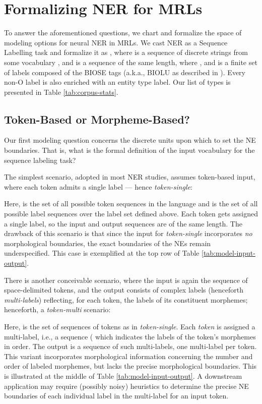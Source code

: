 \documentclass[11pt,a4paper]{article}
\newcommand{\TOKMACRO}{{\em token-single}\xspace}
\newcommand{\MULMACRO}{{\em token-multi}\xspace}
\begin{document}
\section{Formalizing NER for MRLs}
To answer the aforementioned questions, we  chart and formalize the space of  modeling options for neural NER in MRLs. 
We cast   NER   as a Sequence Labelling task and  formalize it as , where  is a sequence  of  discrete strings from some vocabulary , and  is a sequence  of the same length,  where , and  is a finite set of labels composed of the BIOSE  tags (a.k.a., BIOLU as described in \citet{ratinov-roth-2009-design}).  Every non-O label is also enriched with an entity type label. Our list of types is presented in Table \ref{tab:corpus-stats}. 

\subsection{Token-Based or Morpheme-Based?}
Our first modeling question concerns the discrete units upon which to set the NE boundaries. That is, what is  the  formal definition of the input vocabulary  for the sequence labeling task?

The simplest scenario,  adopted in most NER studies,
assumes token-based input, where each token admits a single label --- hence \TOKMACRO:

Here,  is the set of all possible token sequences in the language and   is the set of all possible label sequences over the label set defined above. 
Each token gets assigned a single label, so the input and output sequences are of the same length. The drawback of this scenario is that since the input for \TOKMACRO  incorporates {\em no} morphological boundaries, the exact boundaries of the NEs remain underspecified. This case is exemplified at the top row of Table \ref{tab:model-input-output}.

There is another conceivable scenario, where the input is again the sequence of space-delimited tokens, and the output consists of complex labels (henceforth {\em multi-labels}) reflecting, for each  token, the labels of its constituent morphemes; henceforth, a \MULMACRO scenario:

Here,  is the set of sequences of  tokens as in \TOKMACRO.   
Each {\em token} is assigned a multi-label, i.e., a {sequence}  (     which indicates the labels of the token's  morphemes in  order. The output is a sequence of such multi-labels, one multi-label per token. 
This variant incorporates  morphological information concerning the number and order of  labeled morphemes, but lacks the precise morphological boundaries. This is illustrated at the middle of Table \ref{tab:model-input-output}. A downstream application may require (possibly noisy) heuristics to determine the precise NE boundaries of each individual label in the multi-label for an input token.
\end{document}
